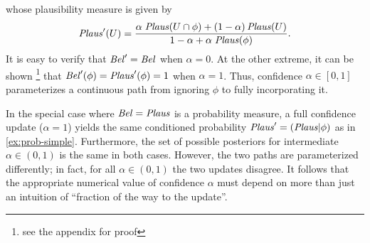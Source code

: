 \begin{example}
whose plausibility measure is given by
\begin{equation}
\mathit{Plaus}'(U) = \frac
	{\alpha\; \mathit{Plaus}(U \cap \phi) + (1-\alpha)\, \mathit{Plaus}(U)}
	{1 - \alpha + \alpha\; \mathit{Plaus}(\phi)}.
\label{eq:ds-plaus}
\end{equation}
It is easy to verify that
$\mathit{Bel}' = \mathit{Bel}$
when $\alpha = 0$.
At the other extreme,
it can be shown
\unskip\footnote{see the appendix for proof}
that
$\mathit{Bel}'(\phi) = \mathit{Plaus}'(\phi) = 1$ when $\alpha = 1$.
Thus, confidence $\alpha \in [0,1]$ parameterizes a continuous path
from ignoring $\phi$ to fully incorporating it.


In the special case where $\mathit{Bel} = \mathit{Plaus}$ is a probability
measure, 
a full confidence update ($\alpha=1$) yields the same conditioned 
probability $\mathit{Plaus}' = (\mathit{Plaus} | \phi)$ as in \cref{ex:prob-simple}.
Furthermore, the set of possible posteriors for intermediate $\alpha \in (0,1)$ is the same in both cases.
However, the two paths are parameterized differently;
	in fact, 
for all $\alpha  \in (0,1)$ the two updates disagree.
It follows that
the appropriate numerical value of confidence $\alpha$ must depend on 
more than just an intuition of ``fraction of the way to the update''.


%


\end{example}
